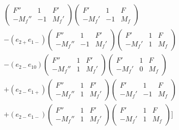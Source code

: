 \begin{align}
\begin{split}
            \begin{pmatrix}
             F''    & 1 & F'\\
            -M_f'' & -1 &M_f'
            \end{pmatrix}
            \begin{pmatrix}
            F'    & 1 & F\\
            -M_f' & -1 &M_f
            \end{pmatrix}\\
            -
            (e_{2+}e_{1-})
            \begin{pmatrix}
             F''    & 1 & F'\\
            -M_f'' & -1 &M_f'
            \end{pmatrix}
            \begin{pmatrix}
            F'    & 1 & F\\
            -M_f' & 1 &M_f
            \end{pmatrix}\\
            -
            (e_{2-}e_{10})
            \begin{pmatrix}
             F''    & 1 & F'\\
            -M_f'' & 1 &M_f'
            \end{pmatrix}
            \begin{pmatrix}
            F'    & 1 & F\\
            -M_f' & 0 &M_f
            \end{pmatrix}\\
            +
            (e_{2-}e_{1+})
            \begin{pmatrix}
             F''    & 1 & F'\\
            -M_f'' & 1 &M_f'
            \end{pmatrix}
            \begin{pmatrix}
            F'    & 1 & F\\
            -M_f' & -1 &M_f
            \end{pmatrix}\\
            +
            (e_{2-}e_{1-})
            \begin{pmatrix}
             F''    & 1 & F'\\
            -M_f'' & 1 &M_f'
            \end{pmatrix}
            \begin{pmatrix}
            F'    & 1 & F\\
            -M_f' & 1 &M_f
            \end{pmatrix}
            ]
    \end{split}
\end{align}
